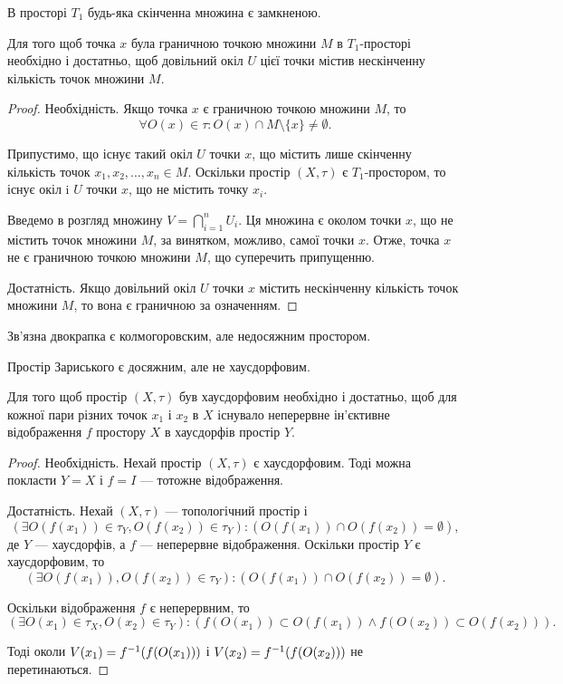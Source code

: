 \begin{corollary}
В просторі $T_1$ будь-яка скінченна множина є
замкненою.
\end{corollary}

\begin{theorem}
Для того щоб точка $x$ була граничною
точкою множини $M$ в $T_1$-просторі необхідно і достатньо,
щоб довільний окіл $U$ цієї точки містив нескінченну
кількість точок множини $M$.
\end{theorem}

\begin{proof}
Необхідність. Якщо точка $x$ є граничною
точкою множини $M$, то \[ \forall O(x) \in \tau: O(x) \cap M \setminus \{x\} \ne \emptyset. \]

Припустимо, що існує такий окіл $U$ точки $x$, що містить
лише скінченну кількість точок $x_1, x_2, \ldots, x_n \in M$. Оскільки
простір $(X, \tau)$ є $T_1$-простором, то існує окіл i $U$ точки $x$, що
не містить точку $x_i$.

Введемо в розгляд множину $V = \bigcap_{i = 1}^n U_i$.
Ця множина є околом точки $x$, що не містить точок
множини $M$, за винятком, можливо, самої точки $x$. Отже,
точка $x$ не є граничною точкою множини $M$, що
суперечить припущенню.

Достатність. Якщо довільний окіл $U$ точки $x$ містить
нескінченну кількість точок множини $M$, то вона є
граничною за означенням.
\end{proof}

\begin{example}
Зв'язна двокрапка є колмогоровским, але
недосяжним простором.
\end{example}

\begin{example}
Простір Зариського є досяжним, але не
хаусдорфовим.
\end{example}

\begin{theorem}
Для того щоб
простір $(X, \tau)$ був хаусдорфовим необхідно і достатньо,
щоб для кожної пари різних точок $x_1$ і $x_2$ в $X$ існувало
неперервне ін'єктивне відображення $f$ простору $X$ в
хаусдорфів простір $Y$.
\end{theorem}

\begin{proof}
Необхідність. Нехай простір $(X, \tau)$ є
хаусдорфовим. Тоді можна покласти $Y = X$ і $f = I$ ---
тотожне відображення.

Достатність. Нехай $(X, \tau)$ --- топологічний простір і
\[ (\exists O(f(x_1)) \in \tau_Y, O(f(x_2)) \in \tau_Y): (O(f(x_1)) \cap O(f(x_2)) = \emptyset), \]
де $Y$ --- хаусдорфів, а
$f$ --- неперервне відображення. Оскільки простір $Y$ є
хаусдорфовим, то
\[ (\exists O(f(x_1)), O(f(x_2)) \in \tau_Y): (O(f(x_1)) \cap O(f(x_2)) = \emptyset). \]

Оскільки відображення $f$ є неперервним, то
\[ (\exists O(x_1) \in \tau_X, O(x_2) \in \tau_Y): (f(O(x_1)) \subset O(f(x_1)) \land f(O(x_2)) \subset O(f(x_2))). \]

Тоді околи $V(x_1) = f^{-1}(f(O(x_1)))$ і $V(x_2) = f^{-1}(f(O(x_2)))$
не перетинаються.
\end{proof}

